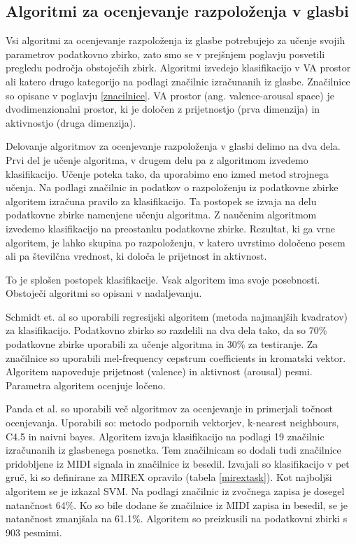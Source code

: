 \documentclass[a4paper, 12pt]{book}
\begin{document}
{\subsection{Algoritmi za ocenjevanje razpoloženja v glasbi} 
\label{algoritmisp}

Vsi algoritmi za ocenjevanje razpoloženja iz glasbe potrebujejo za učenje svojih parametrov podatkovno zbirko, zato smo se v prejšnjem poglavju posvetili pregledu področja obstoječih zbirk. Algoritmi izvedejo klasifikacijo v VA prostor ali katero drugo kategorijo na podlagi značilnic izračunanih iz glasbe. Značilnice so opisane v poglavju \ref{znacilnice}. VA prostor (ang. valence-arousal space) je dvodimenzionalni prostor, ki je določen z prijetnostjo (prva dimenzija) in aktivnostjo (druga dimenzija).

Delovanje algoritmov za ocenjevanje razpoloženja v glasbi delimo na dva dela. Prvi del je učenje algoritma, v drugem delu pa z algoritmom  izvedemo klasifikacijo. Učenje poteka tako, da uporabimo eno izmed metod strojnega učenja. Na podlagi značilnic in podatkov o razpoloženju iz podatkovne zbirke algoritem izračuna pravilo za klasifikacijo. Ta postopek se izvaja na delu podatkovne zbirke namenjene učenju algoritma. Z naučenim algoritmom izvedemo klasifikacijo na preostanku podatkovne zbirke. Rezultat, ki ga vrne algoritem, je lahko skupina po razpoloženju, v katero uvrstimo določeno pesem ali pa številčna vrednost, ki določa le prijetnost in aktivnost.

To je splošen postopek klasifikacije. Vsak algoritem ima svoje posebnosti. Obstoječi algoritmi so opisani v nadaljevanju. 

Schmidt et. al \cite{schmidt2009projection} so uporabili regresijski algoritem (metoda najmanjših kvadratov) za klasifikacijo. Podatkovno zbirko so razdelili na dva dela tako, da so 70\% podatkovne zbirke uporabili za učenje algoritma in 30\% za testiranje. Za značilnice so uporabili mel-frequency cepstrum coefficients in kromatski vektor. Algoritem napoveduje prijetnost (valence) in aktivnost (arousal) pesmi. Parametra algoritem ocenjuje ločeno. 

Panda et al. \cite{panda2013multi} so uporabili več algoritmov za ocenjevanje in primerjali točnost ocenjevanja. Uporabili so: metodo podpornih vektorjev, k-nearest neighbours, C4.5 in naivni bayes. Algoritem izvaja klasifikacijo na podlagi 19 značilnic izračunanih iz glasbenega posnetka. Tem značilnicam so dodali tudi značilnice pridobljene iz MIDI signala in značilnice iz besedil. Izvajali so klasifikacijo v pet gruč, ki so definirane za MIREX opravilo (tabela \ref{mirextask}).  Kot najboljši algoritem se je izkazal SVM. Na podlagi značilnic iz zvočnega zapisa je dosegel natančnost 64\%. Ko so bile dodane še značilnice iz MIDI zapisa in besedil, se je natančnost zmanjšala na 61.1\%. Algoritem so preizkusili na podatkovni zbirki s 903 pesmimi. 

}
\end{document}
